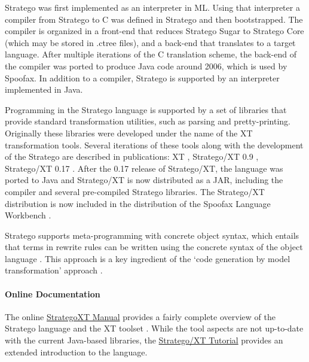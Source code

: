 Stratego was first implemented as an interpreter in ML. Using that interpreter a
compiler from Stratego to C was defined in Stratego and then bootstrapped. 
The compiler is organized in a front-end that reduces Stratego Sugar to Stratego
Core (which may be stored in .ctree files), and a back-end that translates
to a target language. After multiple iterations of the C translation scheme, the
back-end of the compiler was ported to produce Java code around 2006, which is
used by Spoofax. In addition to a compiler, Stratego is supported by an
interpreter implemented in Java.

Programming in the Stratego language is supported by a set of libraries that
provide standard transformation utilities, such as parsing and pretty-printing.
Originally these libraries were developed under the name of the XT
transformation tools. Several iterations of these tools along with the
development of the Stratego are described in publications: XT \cite{JongeVV01},
Stratego/XT 0.9 \cite{Visser03}, Stratego/XT 0.17 \cite{BravenboerKVV08}. 
After the 0.17 release of Stratego/XT, the language was ported to Java and
Stratego/XT is now distributed as a JAR, including the compiler and several
pre-compiled Stratego libraries.
The Stratego/XT distribution is now included in the distribution of the Spoofax
Language Workbench \cite{KatsV10}.

Stratego supports meta-programming with concrete object syntax, which entails
that terms in rewrite rules can be written using the concrete syntax of the
object language \cite{Visser02}. 
This approach is a key ingredient of the `code generation by model
transformation' approach \cite{HemelKGV10}.


\paragraph{Online Documentation}

The online
\href{http://hydra.nixos.org/job/strategoxt-docs/strategoxt-manual/html/latest/download/1/manual/chunk-chapter/index.html}{StrategoXT
Manual} provides a fairly complete overview of
the Stratego language and the XT toolset \cite{StrategoXTReferenceManual}.
While the tool aspects are not up-to-date with the current Java-based libraries,
the \href{http://hydra.nixos.org/job/strategoxt-docs/strategoxt-manual/html/latest/download/1/manual/chunk-chapter/tutorial.html}{Stratego/XT Tutorial} 
provides an extended introduction to the language.



